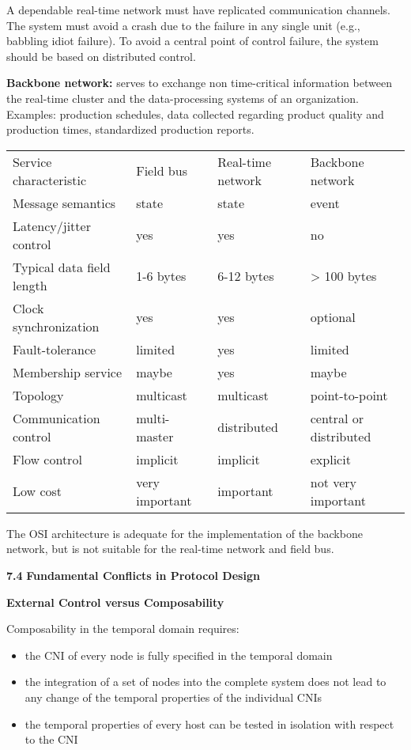 A dependable real-time network must have replicated communication
channels. The system must avoid a crash due to the failure in any single
unit (e.g., babbling idiot failure). To avoid a central point of control
failure, the system should be based on distributed control.

\textbf{Backbone network:} serves to exchange non time-critical
information between the real-time cluster and the data-processing
systems of an organization. Examples: production schedules, data
collected regarding product quality and production times, standardized
production reports.

\begin{longtable}[c]{@{}llll@{}}
\toprule
Service characteristic & Field bus & Real-time network & Backbone
network\tabularnewline
Message semantics & state & state & event\tabularnewline
Latency/jitter control & yes & yes & no\tabularnewline
Typical data field length & 1-6 bytes & 6-12 bytes & \textgreater{} 100
bytes\tabularnewline
Clock synchronization & yes & yes & optional\tabularnewline
Fault-tolerance & limited & yes & limited\tabularnewline
Membership service & maybe & yes & maybe\tabularnewline
Topology & multicast & multicast & point-to-point\tabularnewline
Communication control & multi-master & distributed & central or
distributed\tabularnewline
Flow control & implicit & implicit & explicit\tabularnewline
Low cost & very important & important & not very
important\tabularnewline
\bottomrule
\end{longtable}

The OSI architecture is adequate for the implementation of the backbone
network, but is not suitable for the real-time network and field bus.

\textbf{7.4} \protect\hypertarget{teil5}{}{}\textbf{Fundamental
Conflicts in Protocol Design}

\protect\hypertarget{OLEux5fLINK2}{}{}\textbf{External Control versus
Composability}

Composability in the temporal domain requires:

\begin{itemize}
\item
  the CNI of every node is fully specified in the temporal domain
\item
  the integration of a set of nodes into the complete system does not
  lead to any change of the temporal properties of the individual CNIs
\item
  the temporal properties of every host can be tested in isolation with
  respect to the CNI
\end{itemize}

